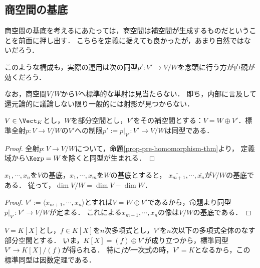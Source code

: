 \documentclass[uplatex, dvipdfmx]{jsreport}
\begin{document}
\subsection{商空間の基底}

\begin{tcolorbox}[colframe=ForestGreen, colback=ForestGreen!10!white, breakable, title=商空間とは指定した部分空間に対して全射線型写像に導かれる空間である]
    商空間の基底を考えるにあたっては，商空間は補空間が生成するものだということを前面に押し出す．
    こちらを定義に据えても良かったが，あまり自然ではないだろう．
\end{tcolorbox}

\begin{remark}
    このような構成も，実際の運用は次の同型$p':V'\to V/W$を念頭に行う方が直観が効くだろう．

    なお，商空間$V/W$から$V$へ標準的な単射は見当たらない．
    即ち，内部に言及して還元論的に議論しない限り一般的には射影が見つからない．
\end{remark}

\begin{proposition}
    $V\in\Vect_K$とし，$W$を部分空間とし，$V'$をその補空間とする：$V=W\oplus V'$．標準全射$p:V\to V/W$の$V'$への制限$p':=p|_{V'}:V'\to V/W$は同型である．
\end{proposition}
\begin{proof}
    全射$p:V\to V/W$について，命題\ref{prop-pre-homomorphism-thm}より，
    定義域から$\Ker p=W$を除くと同型が生まれる．
\end{proof}

\begin{corollary}
    $x_1,\cdots,x_n$を$V$の基底，$x_1,\cdots,x_m$を$W$の基底とすると，
    $\overline{x_{m+1}},\cdots,\overline{x_n}$が$V/W$の基底である．
    従って，$\dim V/W=\dim V-\dim W$．
\end{corollary}
\begin{proof}
    $V':=\langle x_{m+1},\cdots,x_n\rangle$とすれば$V=W\oplus V'$であるから，命題より同型$p|_{V'}:V'\to V/W$が定まる．
    これによる$x_{m+1},\cdots,x_n$の像は$V/W$の基底である．
\end{proof}

\begin{example}[多項式の剰余類]
    $V=K[X]$とし，$f\in K[X]$を$n$次多項式とし，$V'$を$n$次以下の多項式全体のなす部分空間とする．
    いま，$K[X]=(f)\oplus V'$が成り立つから，標準同型$V'\to K[X]/(f)$が得られる．
    特に$f$が一次式の時，$V'=K$となるから，この標準同型は因数定理である．
\end{example}
\end{document}
